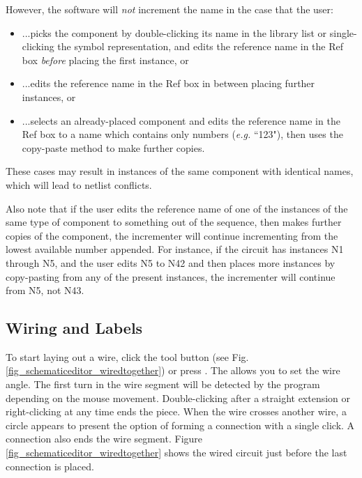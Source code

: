 However, the software will \textit{not} increment the name in the case that the user:
\begin{itemize}
\item ...picks the component by double-clicking its name in the library list or single-clicking the symbol representation, and edits the reference name in the \textsf{Ref} box \textit{before} placing the first instance, or 
\item ...edits the reference name in the \textsf{Ref} box in between placing further instances, or
\item ...selects an already-placed component and edits the reference name in the \textsf{Ref} box to a name which contains only numbers (\textit{e.g.} ``123"), then uses the copy-paste method to make further copies.
\end{itemize}These cases may result in instances of the same component with identical names, which will lead to netlist conflicts. 


Also note that if the user edits the reference name of one of the instances of the same type of component to something out of the sequence, then makes further copies of the component, the incrementer will continue incrementing from the lowest available number appended.  For instance, if the circuit has instances \textsf{N1} through \textsf{N5}, and the user edits \textsf{N5} to \textsf{N42} and then places more instances by copy-pasting from any of the present instances, the incrementer will continue from \textsf{N5}, not \textsf{N43}.

\subsection{Wiring and Labels}
\label{subsec_se_wiringandlabels}

To start laying out a wire, click the  tool button (see Fig. \ref{fig_schematiceditor_wiredtogether}) or press . The  allows you to set the wire angle.  The first turn in the wire segment will be detected by the program depending on the mouse movement.  Double-clicking after a straight extension or right-clicking at any time ends the piece. When the wire crosses another wire, a circle appears to present the option of forming a connection with a single click.  A connection also ends the wire segment. Figure \ref{fig_schematiceditor_wiredtogether} shows the wired circuit just before the last connection is placed.

